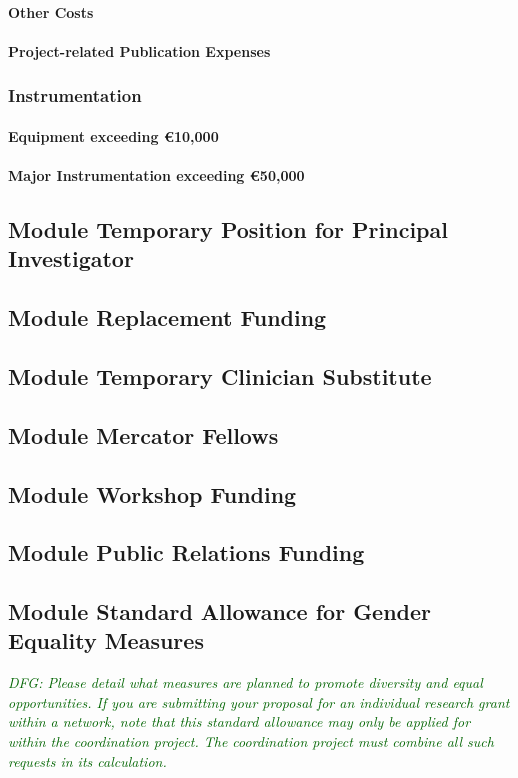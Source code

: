 \documentclass[a4paper,11pt]{amsart}
\theoremstyle{definition}
\newcommand{\<}{\langle}
\renewcommand{\>}{\rangle}
\newcommand{\dfg}[1]{\emph{\textcolor{darkgreen}{DFG: #1}}}
\begin{document}
\paragraph{Other Costs}

\paragraph{Project-related Publication Expenses}


\subsubsection{Instrumentation}
\paragraph{Equipment exceeding \euro 10,000}
\paragraph{Major Instrumentation exceeding \euro 50,000}

\subsection{Module Temporary Position for Principal Investigator}
\subsection{Module Replacement Funding}
\subsection{Module Temporary Clinician Substitute}
\subsection{Module Mercator Fellows}
\subsection{Module Workshop Funding}
\subsection{Module Public Relations Funding}
\subsection{Module Standard Allowance for Gender Equality Measures}
\dfg{Please detail what measures are planned to promote diversity and
  equal opportunities.  If you are submitting your proposal for an
  individual research grant within a network, note that this standard
  allowance may only be applied for within the coordination
  project. The coordination project must combine all such requests in
  its calculation.}
\end{document}
